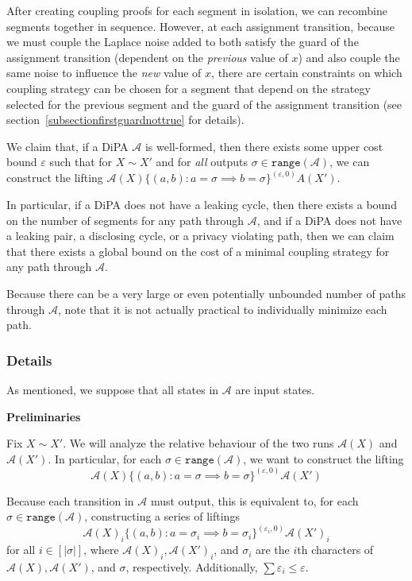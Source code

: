 \documentclass[12pt]{article}
\newcommand{\range}{\texttt{range}}
\theoremstyle{definition}
\begin{document}
After creating coupling proofs for each segment in isolation, we can recombine segments together in sequence. However, at each assignment transition, because we must couple the Laplace noise added to both satisfy the guard of the assignment transition (dependent on the \textit{previous} value of $x$) and also couple the same noise to influence the \textit{new} value of $x$, 
there are certain constraints on which coupling strategy can be chosen for a segment that depend on the strategy selected for the previous segment and the guard of the assignment transition (see section~\ref{subsectionfirstguardnottrue} for details). 

We claim that, if a DiPA $\mathcal{A}$ is well-formed, then there exists some upper cost bound $\varepsilon$ such that for $X\sim X'$ and for \textit{all} outputs $\sigma\in\range(\mathcal{A})$, we can construct the lifting $\mathcal{A}(X)\{(a, b): a=\sigma \implies b=\sigma\}^{(\varepsilon, 0)}A(X')$. 

In particular, if a DiPA does not have a leaking cycle, then there exists a bound on the number of segments for any path through $\mathcal{A}$, and if a DiPA does not have a leaking pair, a disclosing cycle, or a privacy violating path, then we can claim that there exists a global bound on the cost of a minimal coupling strategy for any path through $\mathcal{A}$. 

Because there can be a very large or even potentially unbounded number of paths through $\mathcal{A}$, note that it is not actually practical to individually minimize each path. 

\subsubsection{Details}

As mentioned, we suppose that all states in $\mathcal{A}$ are input states. 

\textbf{Preliminaries}

Fix $X\sim X'$. We will analyze the relative behaviour of the two runs $\mathcal{A}(X)$ and $\mathcal{A}(X')$. In particular, for each $\sigma\in\range(\mathcal{A})$, we want to construct the lifting \[\mathcal{A}(X)\{(a, b): a=\sigma \implies b=\sigma\}^{(\varepsilon, 0)}\mathcal{A}(X')\]

Because each transition in $\mathcal{A}$ must output, this is equivalent to, for each $\sigma \in \range(\mathcal{A})$, constructing a series of liftings \[\mathcal{A}(X)_i\{(a, b): a=\sigma_i \implies b=\sigma_i\}^{(\varepsilon_i, 0)}\mathcal{A}(X')_i\]
for all $i \in [|\sigma|]$, where $\mathcal{A}(X)_i, \mathcal{A}(X')_i$, and $\sigma_i$ are the $i$th characters of $\mathcal{A}(X), \mathcal{A}(X')$, and $\sigma$, respectively. Additionally, $\sum\varepsilon_i \leq \varepsilon$.
\end{document}
